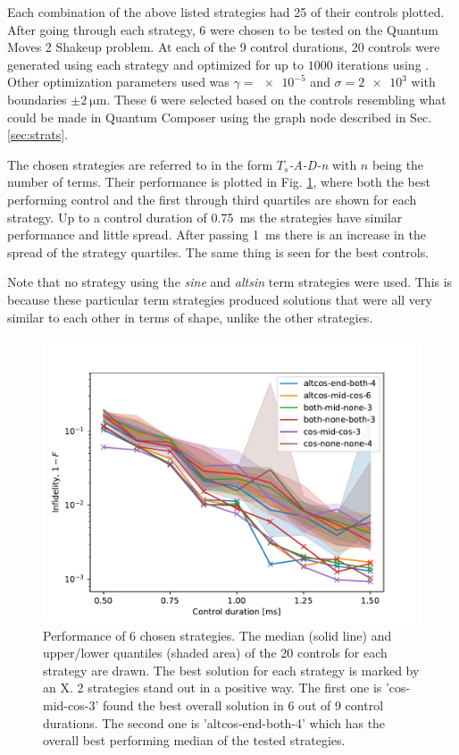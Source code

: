 \documentclass[a4paper, twocolumn]{revtex4-1}
\begin{document}
Each combination of the above listed strategies had 25 of their controls plotted. After going through each strategy, 6 were chosen to be tested on the Quantum Moves 2 Shakeup problem. At each of the 9 control durations, 20 controls were generated using each strategy and optimized for up to $1000$ iterations using . Other optimization parameters used was $\gamma = \num{e-5}$ and $\sigma = \num{2e3}$ with boundaries $\pm\SI{2}{\micro\meter}$. These 6 were selected based on the controls resembling what could be made in Quantum Composer using the graph node described in Sec. \ref{sec:strats}. 

The chosen strategies are referred to in the form \textit{$T_s$-A-D-n} with $n$ being the number of terms. Their performance is plotted in Fig. \ref{fig:qengine-seeding-strats}, where both the best performing control and the first through third quartiles are shown for each strategy. Up to a control duration of \SI{0.75}{\ms} the strategies have similar performance and little spread. After passing \SI{1}{\ms} there is an increase in the spread of the strategy quartiles. The same thing is seen for the best controls. 

Note that no strategy using the \textit{sine} and \textit{altsin} term strategies were used. This is because these particular term strategies produced solutions that were all very similar to each other in terms of shape, unlike the other strategies.

\begin{figure}
	\includegraphics[width=\columnwidth]{graphics/strategies/seeding_strats_results/quantiles.pdf}
	\caption{Performance of 6 chosen strategies. The median (solid line) and upper/lower quantiles (shaded area) of the 20 controls for each strategy are drawn. The best solution for each strategy is marked by an X. 2 strategies stand out in a positive way. The first one is 'cos-mid-cos-3' found the best overall solution in 6 out of 9 control durations. The second one is 'altcos-end-both-4' which has the overall best performing median of the tested strategies.}
	\label{fig:qengine-seeding-strats}
\end{figure}
\end{document}
